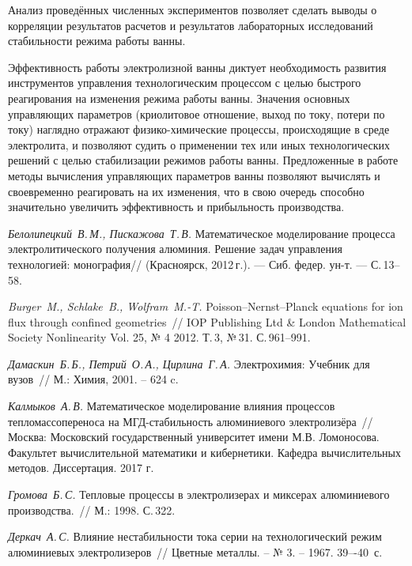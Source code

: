 \documentclass[]{pmi}
\begin{document}
Анализ проведённых численных экспериментов позволяет сделать выводы о корреляции результатов расчетов и результатов лабораторных исследований стабильности режима работы ванны.


Эффективность работы электролизной ванны диктует необходимость развития инструментов управления технологическим процессом с целью быстрого реагирования на изменения режима работы ванны. Значения основных управляющих параметров (криолитовое отношение, выход по току, потери по току) наглядно отражают физико-химические процессы, происходящие в среде электролита, и позволяют судить о применении тех или иных технологических решений с целью стабилизации режимов работы ванны. Предложенные в работе методы вычисления управляющих параметров ванны позволяют вычислять и своевременно реагировать на их изменения, что в свою очередь способно значительно увеличить эффективность и прибыльность производства.

\begin{pmireferences}
    \item
    \label{litlink:belo}
    \textit{Белолипецкий~В.\,М., Пискажова~Т.\,В.}
    Математическое моделирование процесса электролитического получения алюминия. Решение задач управления технологией: монография//
    (Красноярск, 2012\,г.). --- Сиб. федер. ун-т. ---
    С.\,13--58.
    \item
    \label{litlink:burger}
    \textit{Burger~M., Schlake~B., Wolfram~M.-T.}
    Poisson–Nernst–Planck equations for ion flux through confined geometries~// IOP Publishing Ltd \& London Mathematical Society Nonlinearity
    Vol. 25, № 4 2012. Т.\,3, №\,31.
    С.\,961--991.
    \item
    \label{litlink:damaskin}
    \textit{Дамаскин~Б.\,Б., Петрий~О.\,А., Цирлина~Г.\,А.}
    Электрохимия: Учебник для вузов~// 
    М.: Химия, 2001. – 624 c.
    \item
    \label{litlink:kalmykov}
    \textit{Калмыков~А.\,В.}
    Математическое моделирование влияния процессов тепломассопереноса на МГД-стабильность алюминиевого электролизёра~// Москва: Московский государственный университет имени М.В. Ломоносова. Факультет вычислительной математики и кибернетики. Кафедра вычислительных методов. Диссертация. 2017 г.
    \item
    \label{litlink:VAMI}
    \textit{Громова~Б.\,С.}
    Тепловые процессы в электролизерах и миксерах алюминиевого производства.~// М.: 1998. С.\,322.
    \item
    \label{litlink:derkach2}
    \textit{Деркач~А.\,С.}
    Влияние нестабильности тока серии на технологический режим алюминиевых электролизеров~// Цветные металлы. – № 3. – 1967. 39–-40~с.
    \end{pmireferences}
\end{document}
